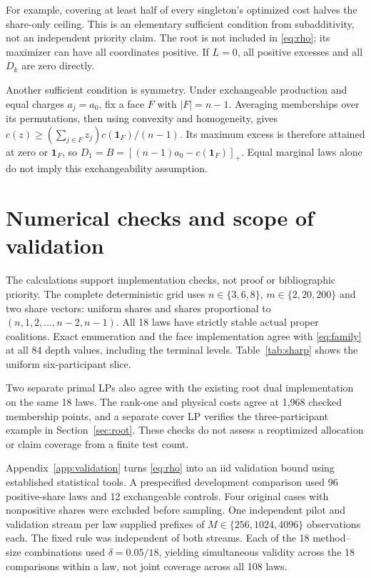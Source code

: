 \documentclass[11pt,a4paper]{article}
\theoremstyle{remark}
\newcommand{\one}{\mathbf 1}
\begin{document}
For example, covering at least half of every singleton's optimized
cost halves the share-only ceiling. This is an elementary sufficient
condition from subadditivity, not an independent priority claim.
The root is not included in \eqref{eq:rho}; its maximizer can have
all coordinates positive. If $L=0$, all positive excesses and
all $D_k$ are zero directly.

Another sufficient condition is symmetry. Under exchangeable
production and equal charges $a_j=a_0$, fix a face $F$ with
$|F|=n-1$. Averaging memberships over its permutations, then
using convexity and homogeneity, gives
$c(z)\ge(\sum_{j\in F}z_j)c(\one_F)/(n-1)$.
Its maximum excess is therefore attained at zero or $\one_F$,
so $D_1=B=[(n-1)a_0-c(\one_F)]_+$. Equal marginal laws alone
do not imply this exchangeability assumption.

\section{Numerical checks and scope of validation}\label{sec:evidence}

The calculations support implementation checks, not proof or
bibliographic priority. The complete deterministic grid uses
$n\in\{3,6,8\}$, $m\in\{2,20,200\}$ and two share vectors:
uniform shares and shares proportional to
$(n,1,2,\ldots,n-2,n-1)$. All 18 laws have strictly stable actual
proper coalitions. Exact enumeration and the face implementation
agree with \eqref{eq:family} at all 84 depth values, including
the terminal levels. Table~\ref{tab:sharp} shows the uniform
six-participant slice.

\begin{table}[htbp]
\centering

\caption{Checked values of $D_k/L$ with $B=0$, six uniform shares
and $H=m+8$. The last row is the proved supremum; terminal depth
is exact. Values are generated from the saved deterministic results.}
\label{tab:sharp}
\end{table}

Two separate primal LPs also agree with the existing root dual
implementation on the same 18 laws. The rank-one and physical costs
agree at 1,968 checked membership points, and a separate cover LP
verifies the three-participant example in
Section~\ref{sec:root}. These checks do not assess a reoptimized
allocation or claim coverage from a finite test count.

Appendix~\ref{app:validation} turns \eqref{eq:rho} into an iid
validation bound using established statistical tools. A prespecified
development comparison used 96 positive-share laws and 12
exchangeable controls. Four original cases with nonpositive
shares were excluded before sampling. One independent pilot and
validation stream per law supplied prefixes of
$M\in\{256,1024,4096\}$ observations each. The fixed rule was
independent of both streams. Each of the 18 method--size combinations
used $\delta=0.05/18$, yielding simultaneous validity across
the 18 comparisons within a law, not joint coverage across all
108 laws.
\end{document}
